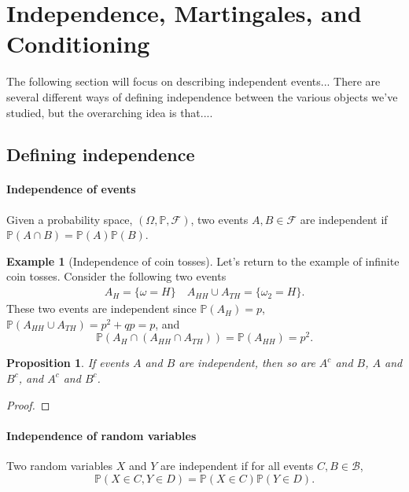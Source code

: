 \documentclass[12pt]{article}
\newcommand{\calF}{\mathcal{F}}
\newcommand{\Prob}{\mathbb{P}}
\newtheorem{prop}[thm]{Proposition}
\theoremstyle{definition}
\newtheorem{exmp}[thm]{Example}
\theoremstyle{remark}
\numberwithin{equation}{section}
\begin{document}
\section{Independence, Martingales, and Conditioning}%
  \label{sec:independence_martingales_and_conditioning}
  The following section will focus on describing independent events... There are several different ways of defining independence between the various objects we've studied, but the overarching idea is that....

  \subsection{Defining independence}%
  \label{sub:defining_independence}
  
  \paragraph{Independence of events}%
  \label{par:independence_of_events}
  
  Given a probability space, $(\Omega, \Prob, \calF)$, two events $A, B \in \calF$ are independent if $\Prob(A \cap B) = \Prob(A)\Prob(B)$.
 \begin{exmp}[Independence of coin tosses]
   Let's return to the example of infinite coin tosses. Consider the following two events 
   \begin{align}
     A_H = \{ \omega = H \} \quad A_{HH} \cup A_{TH} = \{ \omega_2 = H \}.
   \end{align}
   These two events are independent since $\Prob(A_H) = p$, $\Prob(A_{HH} \cup A_{TH}) = p^2 + qp = p$, and
   \begin{equation}
     \Prob(A_H \cap (A_{HH} \cap A_{TH})) = \Prob(A_{HH}) = p^2.
   \end{equation}
 \end{exmp} 

 \begin{prop}
 If events $A$ and $B$ are independent, then so are $A^c$ and $B$, $A$ and $B^c$, and $A^c$ and $B^c$.
 \end{prop}

 \begin{proof}
\end{proof} 

 \paragraph{Independence of random variables}%
 \label{par:independence_of_random_variables}
 Two random variables $X$ and $Y$ are independent if for all events $C, B \in \mathcal{B}$, 
 \begin{equation}
   \Prob(X \in C, Y \in D) = \Prob(X\in C)\Prob(Y \in D).
 \end{equation}
 
\end{document}
